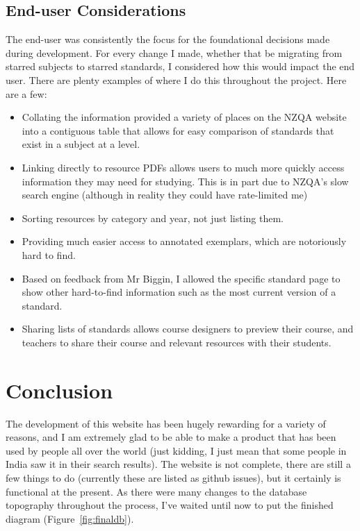 \documentclass{article}
\begin{document}
\subsection*{End-user Considerations}
The end-user was consistently the focus for the foundational decisions made during development. For every change I made, whether that be migrating from starred subjects to starred standards, I considered how this would impact the end user. There are plenty examples of where I do this throughout the project. Here are a few:
\begin{itemize}
    \item Collating the information provided a variety of places on the NZQA website into a contiguous table that allows for easy comparison of standards that exist in a subject at a level.
    \item Linking directly to resource PDFs allows users to much more quickly access information they may need for studying. This is in part due to NZQA's slow search engine (although in reality they could have rate-limited me)
    \item Sorting resources by category and year, not just listing them.
    \item Providing much easier access to annotated exemplars, which are notoriously hard to find. 
    \item Based on feedback from Mr Biggin, I allowed the specific standard page to show other hard-to-find information such as the most current version of a standard.
    \item Sharing lists of standards allows course designers to preview their course, and teachers to share their course and relevant resources with their students.
\end{itemize}

\section{Conclusion}
The development of this website has been hugely rewarding for a variety of reasons, and I am extremely glad to be able to make a product that has been used by people all over the world (just kidding, I just mean that some people in India saw it in their search results). The website is not complete, there are still a few things to do (currently these are listed as github issues), but it certainly is functional at the present. As there were many changes to the database topography throughout the process, I've waited until now to put the finished diagram (Figure~\ref{fig:finaldb}).
\end{document}
